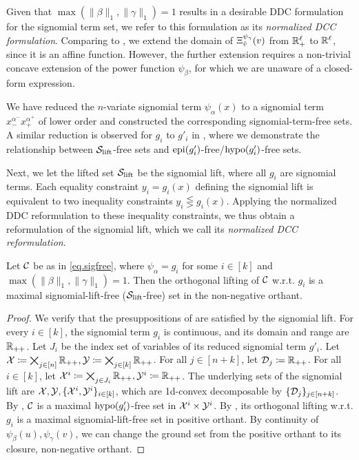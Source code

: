 Given that $ \max(\lVert \beta \rVert_1, \lVert \gamma \rVert_1 ) = 1$ results in a desirable DDC formulation for the signomial term set, we refer to this formulation as its \emph{normalized DCC formulation}.  Comparing  to , we extend the domain of ${\Xi^{\psi_{\gamma}}_{\tilde{v}}}(v)$ from $\mathbb R^{\ell}_{+}$ to $\mathbb R^{\ell}$, since it is an affine function. However, the further extension requires a non-trivial concave extension of the power function $\psi_{\beta}$, for which we are unaware of a closed-form expression.

We have reduced the $n$-variate signomial term $\psi_{\alpha}(x)$ to a signomial term $ x_{-}^{\alpha^-}  x_{+}^{\alpha^+}$ of lower order and constructed the corresponding signomial-term-free sets. A similar reduction is observed for $g_i$ to $g'_i$ in , where we demonstrate the relationship between  $\mathcal S_{\mathrm{lift}}$-free sets and  $\operatorname{epi}(g'_i)$-free/$\operatorname{hypo}(g'_i)$-free sets.

Next, we let the lifted set $\mathcal S_{\mathrm{lift}}$ be the signomial lift,  where all $g_i$ are signomial terms. Each equality constraint $y_i = g_i(x)$ defining the signomial lift is equivalent to two inequality constraints $y_i \lesseqgtr g_i(x)$.  Applying the normalized DDC reformulation to  these inequality constraints, we thus obtain a reformulation of the signomial lift, which we call its \emph{normalized DCC reformulation}.



\begin{corollary}
\label{cor.maxsig}
 Let $\mathcal C$ be as in \eqref{eq.sigfree}, where  $\psi_{\alpha} = g_i$ for some $i \in [k]$ and $\max(\lVert \beta \rVert_1, \lVert \gamma \rVert_1 ) = 1$.  Then the orthogonal lifting of $\mathcal C$ w.r.t. $g_i$ is a maximal signomial-lift-free ($\mathcal S_{\mathrm{lift}}$-free) set in the non-negative orthant.
\end{corollary}
\begin{proof}
	We verify that the presuppositions of  are satisfied by the signomial lift. For every $i \in [k]$, the signomial term $g_i$ is continuous, and its domain and range are  $\mathbb R_{++}$. Let $J_i$ be the index set of variables of its reduced signomial term $g'_i$. Let $\mathcal X \coloneqq \bigtimes_{j \in [n]} \mathbb R_{++}, \mathcal Y \coloneqq  \bigtimes_{j \in [k]} \mathbb R_{++}$. For all $j \in [n+k]$,  let $\mathcal D_j \coloneqq \mathbb R_{++}$. For all $i \in [k]$, let $\mathcal X^i \coloneqq \bigtimes_{j \in J_i} \mathbb R_{++}, \mathcal Y^i \coloneqq \mathbb R_{++}$. The underlying sets of the signomial lift are $\mathcal X,\mathcal Y, \{\mathcal X^i, \mathcal Y^i\}_{i \in [k]}$, which are 1d-convex decomposable by $\{\mathcal D_j\}_{j \in [n+k]}$.  By , $\mathcal C$  is a maximal $\operatorname{hypo}(g'_i)$-free set in $\mathcal X^i \times \mathcal Y^i$. By , its orthogonal lifting w.r.t. $g_i$ is a maximal signomial-lift-free set in positive orthant. By continuity of $\psi_{\beta}(u), \psi_{\gamma}( v)$, we can change the ground set from  the positive orthant to its closure, \ie non-negative orthant.
\end{proof}



